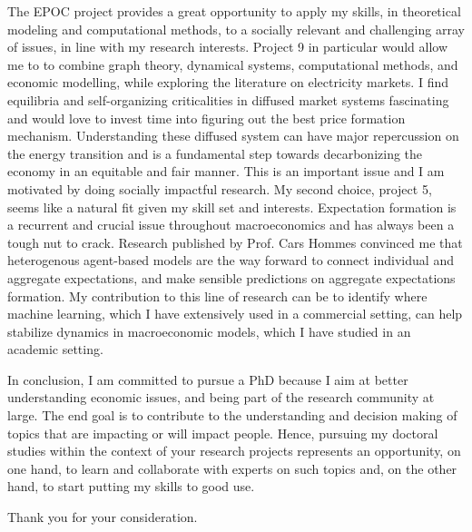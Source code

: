 \documentclass{letter}
\begin{document}
\begin{letter}{}
\begin{adjustwidth}{-30pt}{-30pt}
        The EPOC project provides a great opportunity to apply my skills, in theoretical modeling and computational methods, to a socially relevant and challenging array of issues, in line with my research interests. Project 9 in particular would allow me to to combine graph theory, dynamical systems, computational methods, and economic modelling, while exploring the literature on electricity markets. I find equilibria and self-organizing criticalities in diffused market systems fascinating and would love to invest time into figuring out the best price formation mechanism. Understanding these diffused system can have major repercussion on the energy transition and is a fundamental step towards decarbonizing the economy in an equitable and fair manner. This is an important issue and I am motivated by doing socially impactful research. My second choice, project 5, seems like a natural fit given my skill set and interests. Expectation formation is a recurrent and crucial issue throughout macroeconomics and has always been a tough nut to crack. Research published by Prof. Cars Hommes convinced me that heterogenous agent-based models are the way forward to connect individual and aggregate expectations, and make sensible predictions on aggregate expectations formation. My contribution to this line of research can be to identify where machine learning, which I have extensively used in a commercial setting, can help stabilize dynamics in macroeconomic models, which I have studied in an academic setting.

        In conclusion, I am committed to pursue a PhD because I aim at better understanding economic issues, and being part of the research community at large. The end goal is to contribute to the understanding and decision making of topics that are impacting or will impact people. Hence, pursuing my doctoral studies within the context of your research projects represents an opportunity, on one hand, to learn and collaborate with experts on such topics and, on the other hand, to start putting my skills to good use.
        \closing{Thank you for your consideration.}
    \end{adjustwidth}

\end{letter}
\end{document}

